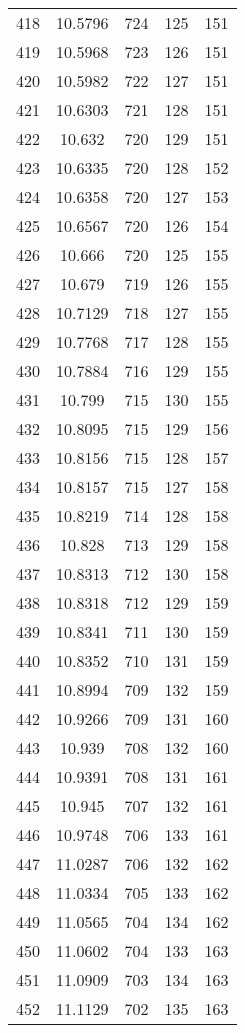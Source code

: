 \documentclass[12pt,a4paper]{article}
\begin{document}
\begin{tabular}{r|cccc}
	418 & 10.5796 & 724 & 125 & 151 \\
	419 & 10.5968 & 723 & 126 & 151 \\
	420 & 10.5982 & 722 & 127 & 151 \\
	421 & 10.6303 & 721 & 128 & 151 \\
	422 & 10.632 & 720 & 129 & 151 \\
	423 & 10.6335 & 720 & 128 & 152 \\
	424 & 10.6358 & 720 & 127 & 153 \\
	425 & 10.6567 & 720 & 126 & 154 \\
	426 & 10.666 & 720 & 125 & 155 \\
	427 & 10.679 & 719 & 126 & 155 \\
	428 & 10.7129 & 718 & 127 & 155 \\
	429 & 10.7768 & 717 & 128 & 155 \\
	430 & 10.7884 & 716 & 129 & 155 \\
	431 & 10.799 & 715 & 130 & 155 \\
	432 & 10.8095 & 715 & 129 & 156 \\
	433 & 10.8156 & 715 & 128 & 157 \\
	434 & 10.8157 & 715 & 127 & 158 \\
	435 & 10.8219 & 714 & 128 & 158 \\
	436 & 10.828 & 713 & 129 & 158 \\
	437 & 10.8313 & 712 & 130 & 158 \\
	438 & 10.8318 & 712 & 129 & 159 \\
	439 & 10.8341 & 711 & 130 & 159 \\
	440 & 10.8352 & 710 & 131 & 159 \\
	441 & 10.8994 & 709 & 132 & 159 \\
	442 & 10.9266 & 709 & 131 & 160 \\
	443 & 10.939 & 708 & 132 & 160 \\
	444 & 10.9391 & 708 & 131 & 161 \\
	445 & 10.945 & 707 & 132 & 161 \\
	446 & 10.9748 & 706 & 133 & 161 \\
	447 & 11.0287 & 706 & 132 & 162 \\
	448 & 11.0334 & 705 & 133 & 162 \\
	449 & 11.0565 & 704 & 134 & 162 \\
	450 & 11.0602 & 704 & 133 & 163 \\
	451 & 11.0909 & 703 & 134 & 163 \\
	452 & 11.1129 & 702 & 135 & 163 \\

\end{tabular}
\end{document}
